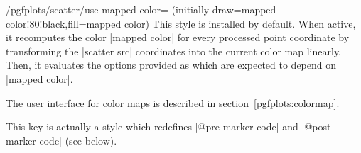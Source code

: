 \begin{stylekey}{/pgfplots/scatter/use mapped color= (initially draw=mapped color!80!black,fill=mapped color)}
	This style is installed by default. When active, it recomputes the color |mapped color| for every processed point coordinate by transforming the |scatter src| coordinates into the current color map linearly. Then, it evaluates the options provided as  which are expected to depend on |mapped color|.

	The user interface for color maps is described in section~\ref{pgfplots:colormap}.
\begin{codeexample}[]
\end{codeexample}

\begin{codeexample}[]
\end{codeexample}

\begin{codeexample}[]
\end{codeexample}
	This key is actually a style which redefines |@pre marker code| and |@post marker code| (see below).
\end{stylekey}

